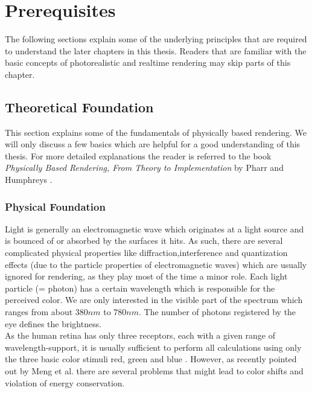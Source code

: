 \documentclass[thesis.tex]{subfiles}
\begin{document}
\chapter{Prerequisites}\label{chap:basics}
The following sections explain some of the underlying principles that are required to understand the later chapters in this thesis.
Readers that are familiar with the basic concepts of photorealistic and realtime rendering may skip parts of this chapter.


\section{Theoretical Foundation}
This section explains some of the fundamentals of physically based rendering.
We will only discuss a few basics which are helpful for a good understanding of this thesis.
For more detailed explanations the reader is referred to the book \emph{Physically Based Rendering, From Theory to Implementation} by Pharr and Humphreys \cite{bib:pbrt}.

\subsection{Physical Foundation}
Light is generally an electromagnetic wave which originates at a light source and is bounced of or absorbed by the surfaces it hits.
As such, there are several complicated physical properties like diffraction,interference and quantization effects (due to the particle properties of electromagnetic waves) which are usually ignored for rendering, as they play most of the time a minor role.
Each light particle (= photon) has a certain wavelength which is responsible for the perceived color.
We are only interested in the visible part of the spectrum which ranges from about $380nm$ to $780nm$.
The number of photons registered by the eye defines the brightness.
\\
As the human retina has only three receptors, each with a given range of wavelength-support, it is usually sufficient to perform all calculations using only the three basic color stimuli red, green and blue \cite{bib:colorscience}.
However, as recently pointed out by Meng et al. \cite{bib:spectrumrendering} there are several problems that might lead to color shifts and violation of energy conservation. 
\end{document}
